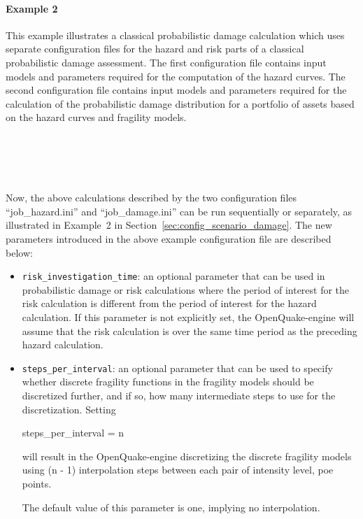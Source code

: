 \paragraph{Example 2}

This example illustrates a classical probabilistic damage calculation which
uses separate configuration files for the hazard and risk parts of a classical
probabilistic damage assessment. The first configuration file contains input
models and parameters required for the computation of the hazard curves. The
second configuration file contains input models and parameters required for
the calculation of the probabilistic damage distribution for a portfolio of
assets based on the hazard curves and fragility models.

\inputminted[firstline=1,firstnumber=1,fontsize=\footnotesize,frame=single,linenos,bgcolor=lightgray,label=job\_hazard.ini]{ini}{oqum/risk/verbatim/config_classical_hazard.ini}\\

\inputminted[firstline=1,firstnumber=1,fontsize=\footnotesize,frame=single,linenos,bgcolor=lightgray,label=job\_damage.ini]{ini}{oqum/risk/verbatim/config_classical_damage.ini}\\

Now, the above calculations described by the two configuration files
``job\_hazard.ini'' and ``job\_damage.ini'' can be run sequentially or
separately, as illustrated in Example~2 in
Section~\ref{sec:config_scenario_damage}. The new parameters introduced in the
above example configuration file are described below:

\begin{itemize}

  \item \Verb+risk_investigation_time+: an optional parameter that can be used
    in probabilistic damage or risk calculations where the period of interest
    for the risk calculation is different from the period of interest for the 
    hazard calculation. If this parameter is not explicitly set, the 
    OpenQuake-engine will assume that the risk calculation is over the same 
    time period as the preceding hazard calculation.

  \item \Verb+steps_per_interval+: an optional parameter that can be used to
    specify whether discrete fragility functions in the fragility models should
    be discretized further, and if so, how many intermediate steps to use for
    the discretization. Setting 

    steps\_per\_interval = n

    will result in the OpenQuake-engine discretizing the discrete fragility
    models using (n - 1) interpolation steps between each pair of 
    {intensity level, poe} points.

    The default value of this parameter is one, implying no interpolation.

\end{itemize}
